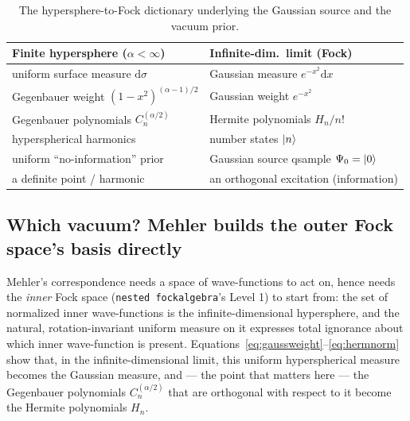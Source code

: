 \documentclass[11pt, a4paper]{article}
\begin{document}
\begin{table}[htbp]
\centering
\begin{tabular}{l|l}
\textbf{Finite hypersphere ($\alpha<\infty$)} & \textbf{Infinite-dim.\ limit (Fock)} \\
\hline
uniform surface measure $\mathrm{d}\sigma$ & Gaussian measure $e^{-x^2}\mathrm{d}x$ \\
Gegenbauer weight $(1-x^2)^{(\alpha-1)/2}$ & Gaussian weight $e^{-x^2}$
   \\
Gegenbauer polynomials $C_n^{(\alpha/2)}$ & Hermite polynomials $H_n/n!$
   \\
hyperspherical harmonics & number states $\ket{n}$ \\
uniform ``no-information'' prior & Gaussian source qsample $\Psi_0=\ket{0}$ \\
a definite point / harmonic & an orthogonal excitation (information) \\
\end{tabular}
\caption{The hypersphere-to-Fock dictionary underlying the Gaussian source and
the vacuum prior.}
\label{tab:dictionary}
\end{table}

\subsection{Which vacuum? Mehler builds the outer Fock space's basis
directly}
\label{sec:innerouter}

Mehler's correspondence needs a space of wave-functions to act on, hence
needs the \emph{inner} Fock space (\texttt{nested\textunderscore
fock\textunderscore algebra}'s Level 1) to start from: the set of normalized
inner wave-functions is the infinite-dimensional hypersphere, and the
natural, rotation-invariant uniform measure on it expresses total ignorance
about which inner wave-function is present.
Equations~\eqref{eq:gaussweight}--\eqref{eq:hermnorm} show that, in the
infinite-dimensional limit, this uniform hyperspherical measure becomes the
Gaussian measure, and --- the point that matters here --- the Gegenbauer
polynomials $C_n^{(\alpha/2)}$ that are orthogonal with respect to it become
the Hermite polynomials $H_n$.
\end{document}
